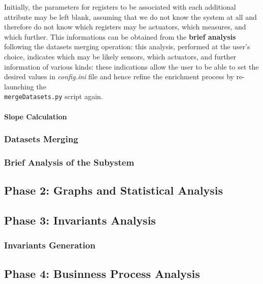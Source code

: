 Initially, the parameters for registers to be associated with each additional attribute may be left blank, assuming that we do not know the system at all and therefore do not know which registers may be actuators, which measures, and which further. This informations can be obtained from the \textbf{brief analysis} following the datasets merging operation: this analysis, performed at the user's choice, indicates which may be likely sensors, which actuators, and further information of various kinds: these indications allow the user to be able to set the desired values in \textit{config.ini} file and hence refine the enrichment process by re-launching the\\ 
\texttt{mergeDatasets.py} script again.

\paragraph{Slope Calculation}

\subsubsection{Datasets Merging}
\label{subsubsec:4_dataset_merging}

\subsubsection{Brief Analysis of the Subystem}
\label{subsubsec:4_brief_analysis}

\subsection{Phase 2: Graphs and Statistical Analysis}
\label{subsec:improve_graphs}

\subsection{Phase 3: Invariants Analysis}
\label{subsec:improve_invariants}

\subsubsection{Invariants Generation}

\subsection{Phase 4: Businness Process Analysis}
\label{subsec:improve_bpa}


\vfill
\nolinenumbers